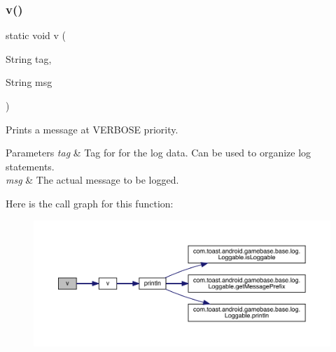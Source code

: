 \subsubsection{\texorpdfstring{v()}{v()}\hspace{0.1cm}{\footnotesize\ttfamily [2/2]}}
{\footnotesize\ttfamily static void v (\begin{DoxyParamCaption}\item[{String}]{tag,  }\item[{String}]{msg }\end{DoxyParamCaption})\hspace{0.3cm}{\ttfamily [static]}}



Prints a message at V\+E\+R\+B\+O\+SE priority. 


\begin{DoxyParams}{Parameters}
{\em tag} & Tag for for the log data. Can be used to organize log statements. \\
\hline
{\em msg} & The actual message to be logged. \\
\hline
\end{DoxyParams}
Here is the call graph for this function\+:
\nopagebreak
\begin{figure}[H]
\begin{center}
\leavevmode
\includegraphics[width=350pt]{classcom_1_1toast_1_1android_1_1gamebase_1_1base_1_1log_1_1_logger_ae07d1a03ee97d15c0d205633497ea327_cgraph}
\end{center}
\end{figure}
\mbox{\label{classcom_1_1toast_1_1android_1_1gamebase_1_1base_1_1log_1_1_logger_af39c88dd6f05a7752d16c7de3f48bf46}} 
